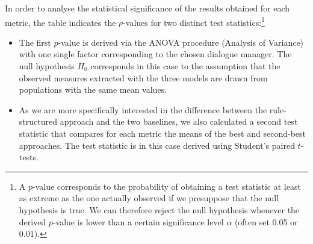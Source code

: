 In order to analyse the statistical significance of the results obtained for each metric, the table indicates the $p$-values for two distinct test statistics:\footnote{A $p$-value corresponds to the probability of obtaining a test statistic at least as extreme as the one actually observed if we presuppose that the null hypothesis is true.  We can therefore reject the null hypothesis whenever the derived $p$-value is lower than a certain significance level $\alpha$ (often set 0.05 or 0.01).}
\begin{itemize}
\item The first $p$-value is derived via the ANOVA procedure (Analysis of Variance) with one single factor corresponding to the chosen dialogue manager. The null hypothesis $H_0$ corresponds in this case to the assumption that the observed measures extracted with the three models are drawn from populations with the same mean values.  

\item As we are more specifically interested in the difference between the rule-structured approach and the two baselines, we also calculated a second test statistic that compares for each metric the means of the best and second-best approaches. The test statistic is in this case derived using Student's paired $t$-tests.

\end{itemize}


\renewcommand{\arraystretch}{1.2}

